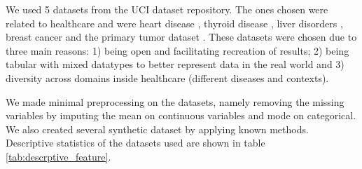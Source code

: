 

We used 5 datasets from the UCI dataset repository. The ones chosen were related to healthcare and were heart disease \cite{misc_heart_disease_45}, thyroid disease \cite{misc_thyroid_disease_102}, liver disorders \cite{misc_liver_disorders_60}, breast cancer \cite{misc_breast_cancer_wisconsin_(diagnostic)_17} and the primary tumor dataset \cite{misc_primary_tumor_83}. These datasets were chosen due to three main reasons: 1) being open and facilitating recreation of results; 2) being tabular with mixed datatypes to better represent data in the real world and 3) diversity across domains inside healthcare (different diseases and contexts).

We made minimal preprocessing on the datasets, namely removing the missing variables by imputing the mean on continuous variables and mode on categorical.
We also created several synthetic dataset by applying known methods. Descriptive statistics of the datasets used are shown in table \ref{tab:descrptive_feature}.
